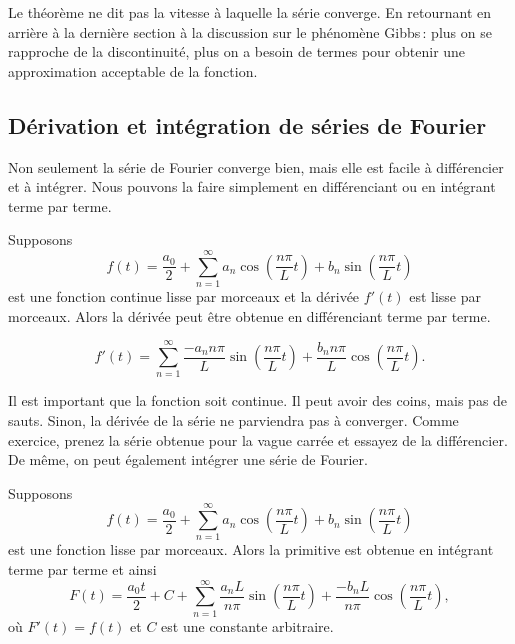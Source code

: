 Le théorème ne dit pas la vitesse à laquelle la série converge. En retournant en arrière à la dernière section à la discussion sur le phénomène Gibbs\,: plus on se rapproche de la discontinuité, plus on a besoin de termes pour obtenir une approximation acceptable de la fonction.  

\subsection{Dérivation et intégration de séries de Fourier}

Non seulement la série de Fourier converge bien, mais elle est facile à différencier
et à intégrer. Nous pouvons la faire simplement en différenciant ou en intégrant terme par terme.

\begin{theorem}
Supposons
\begin{equation*}
f(t) = \frac{a_0}{2} + \sum_{n=1}^\infty a_n \cos \left( \frac{n \pi}{L} t
\right)
+ b_n \sin \left( \frac{n \pi}{L} t \right)
\end{equation*}
est une fonction continue lisse par morceaux et la dérivée $f'(t)$ est  lisse
par morceaux. Alors la dérivée peut être
obtenue en différenciant terme par terme.

\begin{equation*}
f'(t) = \sum_{n=1}^\infty \frac{-a_n n \pi}{L} 
\sin \left( \frac{n \pi}{L} t \right)
+ \frac{b_n n \pi}{L} \cos \left( \frac{n \pi}{L} t \right) .
\end{equation*}
\end{theorem}

Il est important que la fonction soit continue. Il peut avoir des coins, mais pas de
sauts. Sinon, la dérivée de la série ne parviendra pas à converger. Comme 
exercice, prenez la série obtenue pour la vague carrée et essayez de la
différencier. De même, on peut également intégrer une série de Fourier.

\begin{theorem}
Supposons
\begin{equation*}
f(t) = \frac{a_0}{2} + \sum_{n=1}^\infty
a_n \cos \left( \frac{n \pi}{L} t \right)
+ b_n \sin \left( \frac{n \pi}{L} t \right)
\end{equation*}
est une fonction lisse par morceaux. Alors la primitive est
obtenue en intégrant terme par terme et ainsi
\begin{equation*}
F(t) = \frac{a_0 t}{2} + C + \sum_{n=1}^\infty
\frac{a_n L}{n \pi} \sin \left( \frac{n \pi}{L} t \right)
+ \frac{-b_n L}{n \pi}  \cos \left( \frac{n \pi}{L} t \right) ,
\end{equation*}
où  $F'(t) = f(t)$ et $C$ est une constante arbitraire. 
\end{theorem}


